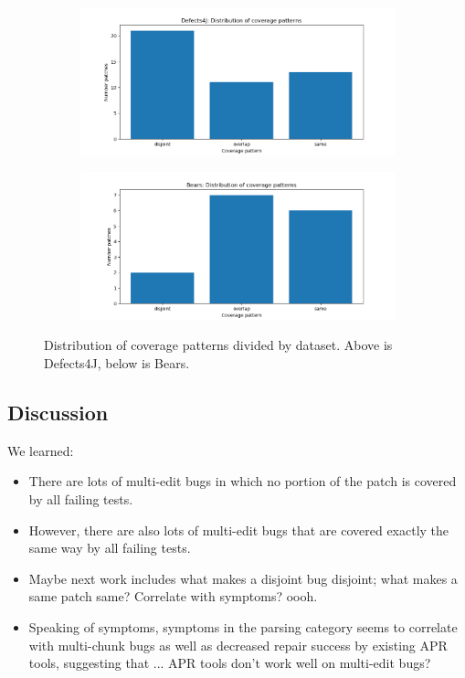 \begin{figure}[h]
	\label{fig:coverage-datasets}
	\begin{subfigure}{\linewidth}
		\includegraphics[width=\linewidth]{img/coverage-d4j.png}
	\end{subfigure}
	\begin{subfigure}{\linewidth}
		\includegraphics[width=\linewidth]{img/coverage-bears.png}
	\end{subfigure}
	\caption{Distribution of coverage patterns divided by dataset. Above is 
	Defects4J, below is Bears.}
\end{figure}



\subsection{Discussion}

We learned:
\begin{itemize}
	\item There are lots of multi-edit bugs in which no portion of the patch is covered by all failing 
	tests.
	\item However, there are also lots of multi-edit bugs that are covered exactly the same way by all 
	failing tests.
	\item Maybe next work includes what makes a disjoint bug disjoint; what makes a same patch 
	same? Correlate with symptoms? oooh.
	\item Speaking of symptoms, symptoms in the parsing category seems to correlate with 
	multi-chunk bugs as well as decreased repair success by existing APR tools, suggesting that ... 
	APR tools don't work well on multi-edit bugs?
\end{itemize}
